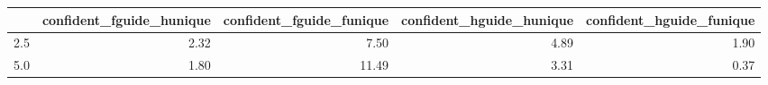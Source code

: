 \begin{tabular}{lrrrr}
\toprule
 & confident_fguide_hunique & confident_fguide_funique & confident_hguide_hunique & confident_hguide_funique \\
\midrule
2.5 & 2.32 & 7.50 & 4.89 & 1.90 \\
5.0 & 1.80 & 11.49 & 3.31 & 0.37 \\
\bottomrule
\end{tabular}
